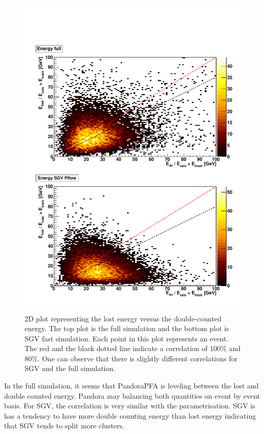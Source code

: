 \begin{figure}[t]
  \centering
  \includegraphics[width=1\linewidth]{chap6/fig_SGV/Correlation_nojet.pdf}
  \caption{2D plot representing the lost energy versus the double-counted energy. The top plot is the full simulation and the bottom plot is SGV fast simulation. Each point in this plot represents an event. The red and the black dotted line indicate a correlation of 100\% and 80\%. One can observe that there is slightly different correlations for SGV and the full simulation.}
  \label{fig:cluster_track_level}
\end{figure}

In the full simulation, it seems that PandoraPFA is leveling between the lost and double counted energy. Pandora may balancing both quantities on event by event basis. For SGV, the correlation is very similar with the parametrisation. SGV is has a tendency to have more double counting energy than lost energy indicating that SGV tends to split more clusters.

